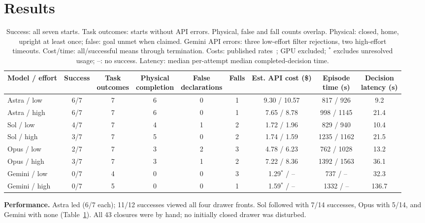 \documentclass{article}
\begin{document}
\section{Results}
\begin{table}[htbp]
  \centering
  \small
  \setlength{\tabcolsep}{3pt}
  \begin{tabular}{lcccccccc}
    \toprule
    Model / effort & Success & \shortstack{Task\\outcomes} & \shortstack{Physical\\completion} &
    \shortstack{False\\declarations} & Falls &
    \shortstack{Est. API\\cost (\$)} & \shortstack{Episode\\time (s)} & \shortstack{Decision\\latency (s)} \\
    \midrule
    Astra / low & 6/7 & 7 & 6 & 0 & 1 & 9.30 / 10.57 & 817 / 926 & 9.2 \\
    Astra / high & 6/7 & 7 & 6 & 0 & 1 & 7.65 / 8.78 & 998 / 1145 & 21.4 \\
    Sol / low & 4/7 & 7 & 4 & 1 & 2 & 1.72 / 1.96 & 829 / 940 & 10.4 \\
    Sol / high & 3/7 & 7 & 5 & 0 & 2 & 1.74 / 1.59 & 1235 / 1162 & 21.5 \\
    Opus / low & 2/7 & 7 & 3 & 2 & 3 & 4.78 / 6.23 & 762 / 1028 & 13.2 \\
    Opus / high & 3/7 & 7 & 3 & 1 & 2 & 7.22 / 8.36 & 1392 / 1563 & 36.1 \\
    Gemini / low & 0/7 & 4 & 0 & 0 & 3 & 1.29$^{*}$ / -- & 737 / -- & 32.3 \\
    Gemini / high & 0/7 & 5 & 0 & 0 & 1 & 1.59$^{*}$ / -- & 1332 / -- & 136.7 \\
    \bottomrule
  \end{tabular}
  \caption{Success: all seven starts. Task outcomes: starts without API errors.
  Physical, false and fall counts overlap. Physical: closed, home, upright at least once;
  false: goal unmet when claimed. Gemini API errors: three low-effort filter
  rejections, two high-effort timeouts. Cost/time: all/successful means through
  termination. Costs: published rates~\citep{openai2026pricing,anthropic2026pricing,google2026pricing};
  GPU excluded; $^{*}$ excludes unresolved usage; --: no success.
  Latency: median per-attempt median completed-decision time.}
  \label{tab:results}
\end{table}
\textbf{Performance.} Astra led (6/7 each); 11/12 successes viewed all four drawer
fronts. Sol followed with 7/14 successes, Opus with 5/14, and Gemini with none
(Table~\ref{tab:results}). All 43 closures were by hand; no initially closed drawer
was disturbed.
\end{document}
